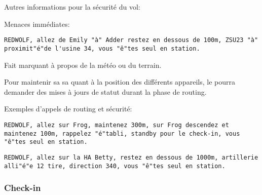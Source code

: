 \begin{e1}
	\item Autres informations pour la sécurité du vol:
	
	\begin{e2}
		
		
		
		\begin{minipage}{\linewidth}
			\item Menaces immédiates:
			
			\begin{lstlisting}[caption=Routing: menace immédiate, label=routingthreat]
	REDWOLF, allez de Emily "à" Adder restez en dessous de 100m, ZSU23 "à" proximit"é"de l'usine 34, vous "ê"tes seul en station.
			\end{lstlisting}
		\end{minipage}
		
		\item Fait marquant à propos de la météo ou du terrain.
		
	\end{e2}
	
	\item Pour maintenir sa \gls{sa} quant à la position des différents appareils, le \ja{} pourra demander des mises à jours de statut durant la phase de routing.
	
	\begin{minipage}{\linewidth}
		\item Exemples d'appels de routing et sécurité:
		
		\begin{lstlisting}[caption=Routing: exemple 1, label=routingex1]
	REDWOLF, allez sur Frog, maintenez 300m, sur Frog descendez et maintenez 100m, rappelez "é"tabli, standby pour le check-in, vous "ê"tes seul en station.
		\end{lstlisting}
		
		\begin{lstlisting}[caption=Routing: exemple 2, label=routingex2]
	REDWOLF, allez sur la HA Betty, restez en dessous de 1000m, artillerie alli"é"e 12 tire, direction 340, vous "ê"tes seul en station.
		\end{lstlisting}
	\end{minipage}

\end{e1}

\subsubsection{Check-in}%


